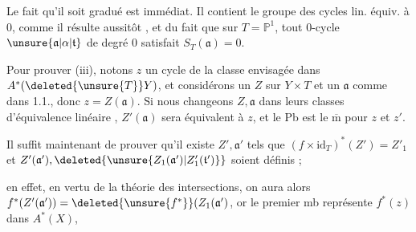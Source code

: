 Le fait qu'il soit gradué est immédiat. Il contient le groupe des cycles lin. équiv. à $0$, comme il résulte aussitôt , et du fait que sur $T=\mathbb P^1$, tout $0$-cycle $\unsure{\mathfrak a|\alpha|\mathfrak{t}}$ de degré $0$ satisfait $S_T(\mathfrak a)=0$. 

Pour prouver (iii), notons $z$ un cycle de la classe envisagée dans $A^*(\deleted{\unsure{T}}Y)$, et considérons un $Z$ sur $Y\times T$ et un $\mathfrak a$ comme dans 1.1., donc $z=Z(\mathfrak a)$. Si nous changeons $Z,\mathfrak a$ dans leurs classes d'équivalence linéaire , $Z'(\mathfrak a)$ sera  équivalent à $z$, et le Pb est le $\overline{\mathrm m}$ pour $z$ et $z'$.

Il suffit maintenant de prouver  qu'il existe $Z',\mathfrak a'$ tels que $(f\times\mathrm{id}_T)^*(Z')=Z'_1$ et $Z'(\mathfrak a'),\deleted{\unsure{Z_1(\mathfrak a')|Z'_1(\mathfrak{t}')}}$ soient définis ;


en effet, en vertu de la théorie des intersections, on aura alors $f^*(Z'(\mathfrak a'))=\deleted{\unsure{f^*}}(Z_1(\mathfrak a')$, or le premier mb  représente $f^*(z)$ dans $A^*(X)$, 

